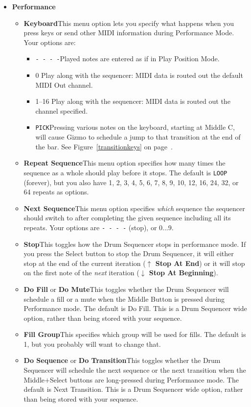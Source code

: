 \documentclass{article}
\begin{document}
\begin{itemize}
\setlength{\leftskip}{0em}
\item {\bf Performance} 
\begin{itemize}
\item {\bf Keyboard}\quad  This menu option lets you specify what happens when you press keys or send other MIDI information during Performance Mode.  Your options are:

 \renewcommand\labelitemiii{$\diamond$}
\begin{itemize}
	\item {\texttt{-~-~-~-}}\quad Played notes are entered as if in Play Position Mode.
	\item {0} \quad Play along with the sequencer: MIDI data is routed out the default MIDI Out channel.
	\item {1--16} \quad Play along with the sequencer: MIDI data is routed out the channel specified.
	\item {\texttt{PICK}}\quad Pressing various notes on the keyboard, starting at Middle C, will cause Gizmo to schedule a jump to that transition at the end of the bar.  See Figure~\ref{transitionkeys} on page~\pageref*{transitionkeys}.
\end{itemize}

\item {\bf Repeat Sequence}\quad This menu option specifies how many times the sequence as a whole should play before it stops.  The default is {\tt LOOP} (forever), but you also have 1, 2, 3, 4, 5, 6, 7, 8, 9, 10, 12, 16, 24, 32, or 64 repeats as options.
\item {\bf Next Sequence}\quad This menu option specifies {\it which} sequence the sequencer should switch to after completing the given sequence including all its repeats.  Your options are {\tt - - - -} (stop), or 0...9.
\item {\bf Stop}\quad This toggles how the Drum Sequencer stops in performance mode.  If you press the Select button to stop the Drum Sequencer, it will either stop at the end of the current iteration ({\bf \(\bm \uparrow\) Stop At End}) or it will stop on the first note of the {\it next} iteration ({\bf \(\bm \downarrow\) Stop At Beginning}).
\item {\bf Do Fill} or {\bf Do Mute}\quad This toggles whether the Drum Sequencer will schedule a fill or a mute when the Middle Button is pressed during Performance mode.  The default is Do Fill.  This is a Drum Sequencer wide option, rather than being stored with your sequence.
\item {\bf Fill Group}\quad This specifies which group will be used for fills.  The default is 1, but you probably will want to change that.
\item {\bf Do Sequence} or {\bf Do Transition}\quad This toggles whether the Drum Sequencer will schedule the next sequence or the next transition when the Middle\(+\)Select buttons are long-pressed during Performance mode.  The default is Next Transition.  This is a Drum Sequencer wide option, rather than being stored with your sequence.
\end{itemize} 


\end{itemize}
\end{document}
